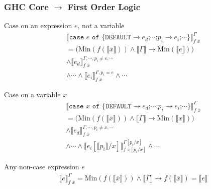 \documentclass[serif,professionalfont]{beamer}
\newcommand\hs[1]{\texttt{#1}}
\newcommand\fn[1]{\mathrm{#1}}
\newcommand\w[0]{\,\,}
\newcommand\eq[0]{ = }
\begin{document}
\begin{frame}[fragile]
\frametitle{GHC Core $\rightarrow$ First Order Logic}

\newcommand{\ctr}[3]{\llbracket #1 \rrbracket^{#2}_{#3}}
\newcommand{\etr}[1]{\llbracket #1 \rrbracket}
\newcommand{\ptr}[1]{\llbracket #1 \rrbracket}
\newcommand{\gtr}[1]{\llbracket #1 \rrbracket}
\newcommand{\subs}[3]{#1 \left[ #2 / #3 \right] }
\newcommand{\case}[2]{\hs{case} \w #1 \w \hs{of} \w \hs{\{} #2 \hs{\}}}
\renewcommand{\min}[1]{\fn{Min}(#1)}

Case on an expression $e$, not a variable
\begin{align*}
& \ctr{\case{e}{ \hs{DEFAULT} \rightarrow e_d \hs{;}
                 \cdots \hs{;}
                 p_i \rightarrow e_i \hs{;}
                 \cdots
              }}{\Gamma}{f \w \overline{x}} \\
& = \big( \min{ f(\etr{\overline{x}}) } \land \gtr{\Gamma} \rightarrow \min{\etr{e}} \big) \\
& \land \ctr{ e_d }{\Gamma , \cdots , p_i \neq e , \cdots }{f \w \overline{x}} \\
& \land \cdots \land \ctr{ e_i }{\Gamma , p_i \eq e }{f \w \overline{x}} \land \cdots
\end{align*}

Case on a variable $x$
\begin{align*}
& \ctr{\case{x}{ \hs{DEFAULT} \rightarrow e_d \hs{;}
                 \cdots \hs{;}
                 p_i \rightarrow e_i \hs{;}
                 \cdots
              }}{\Gamma}{f \w \overline{x}} \\
& = \big( \min{ f(\etr{\overline{x}}) } \land \gtr{\Gamma} \rightarrow \min{\etr{x}} \big) \\
& \land \ctr{ e_d }{\Gamma , \cdots , p_i \neq x , \cdots }{f \w \overline{x}} \\
& \land \cdots \land \ctr{ \subs{e_i}{\ptr{p_i}}{x} }{\subs{\Gamma}{p_i}{x}}{f \w \subs{\overline{x}}{p_i}{x}} \land \cdots
\end{align*}

Any non-case expression $e$
\begin{align*}
& \ctr{e}{\Gamma}{f \w \overline{x}}
 = \min{ f(\etr{\overline{x}}) } \land \gtr{\Gamma} \rightarrow f(\etr{\overline{x}}) = \etr{e}
\end{align*}

\end{frame}
\end{document}
